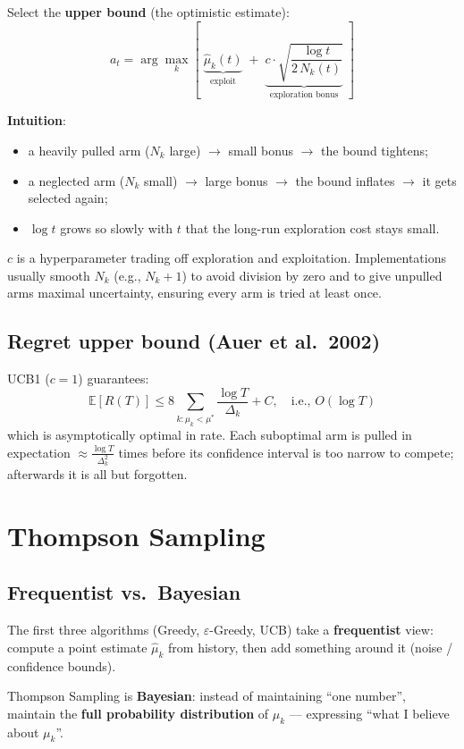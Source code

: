 \documentclass{article}
\begin{document}
Select the \textbf{upper bound} (the optimistic estimate):
\[
\boxed{a_t = \arg\max_k \left[\; \underbrace{\hat{\mu}_k(t)}_{\text{exploit}} \;+\; \underbrace{c \cdot \sqrt{\frac{\log t}{2\,N_k(t)}}}_{\text{exploration bonus}} \;\right]}
\]

\textbf{Intuition}:
\begin{itemize}
  \item a heavily pulled arm ($N_k$ large) $\to$ small bonus $\to$ the bound tightens;
  \item a neglected arm ($N_k$ small) $\to$ large bonus $\to$ the bound inflates $\to$ it gets selected again;
  \item $\log t$ grows so slowly with $t$ that the long-run exploration cost stays small.
\end{itemize}

$c$ is a hyperparameter trading off exploration and exploitation. Implementations usually smooth $N_k$ (e.g., $N_k+1$) to avoid division by zero and to give unpulled arms maximal uncertainty, ensuring every arm is tried at least once.

\subsection*{Regret upper bound (Auer et al.\ 2002)}

UCB1 ($c=1$) guarantees:
\[
\mathbb{E}[R(T)] \le 8\sum_{k: \mu_k < \mu^*} \frac{\log T}{\Delta_k} + C, \quad \text{i.e., } O(\log T)
\]
which is asymptotically optimal in rate. Each suboptimal arm is pulled in expectation $\approx \frac{\log T}{\Delta_k^2}$ times before its confidence interval is too narrow to compete; afterwards it is all but forgotten.

\section*{Thompson Sampling}

\subsection*{Frequentist vs.\ Bayesian}

The first three algorithms (Greedy, $\varepsilon$-Greedy, UCB) take a \textbf{frequentist} view: compute a point estimate $\hat{\mu}_k$ from history, then add something around it (noise / confidence bounds).

Thompson Sampling is \textbf{Bayesian}: instead of maintaining ``one number'', maintain the \textbf{full probability distribution} of $\mu_k$ --- expressing ``what I believe about $\mu_k$''.
\end{document}
